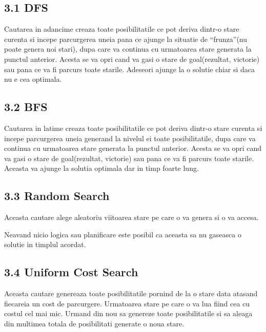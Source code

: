 \documentclass{article} %
\begin{document}
\noindent 
\subsection{3.1 DFS}

 

\noindent Cautarea in adancime creaza toate posibilitatile ce pot deriva dintr-o stare curenta si incepe parcurgerea uneia pana ce ajunge la situatie de ``frunza''(nu poate genera noi stari), dupa care va continua cu urmatoarea stare generata la punctul anterior. Acesta se va opri cand va gasi o stare de goal(rezultat, victorie) sau pana ce va fi parcurs toate starile. Adeseori ajunge la o solutie chiar si daca nu e cea optimala.

\noindent 

\noindent 
\subsection{3.2 BFS}

\noindent 

\noindent Cautarea in latime creaza toate posibilitatile ce pot deriva dintr-o stare curenta si incepe parcurgerea uneia generand la nivelul ei toate posibilitatile, dupa care va continua cu urmatoarea stare generata la punctul anterior. Acesta se va opri cand va gasi o stare de goal(rezultat, victorie) sau pana ce va fi parcurs toate starile. Aceasta va ajunge la solutia optimala dar in timp foarte lung.

\noindent 

\noindent 
\subsection{3.3 Random Search}

\noindent 

\noindent Aceasta cautare alege aleatoriu  viitoarea stare pe care o va genera si o va accesa.

\noindent Neavand nicio logica sau planificare este posibil ca aceasta sa nu gaseasca o solutie in timplul acordat.

\noindent 

\noindent 
\subsection{3.4 Uniform Cost Search}

\noindent 

\noindent Aceasta cautare genereaza toate posibilitatile pornind de la o stare data atasand fiecareia un cost de parcurgere. Urmatoarea stare pe care o va lua fiind cea cu costul cel mai mic. Urmand din nou sa genereze toate posibilitatile si sa aleaga din multimea totala de posibilitati generate o noua stare.
\end{document}
